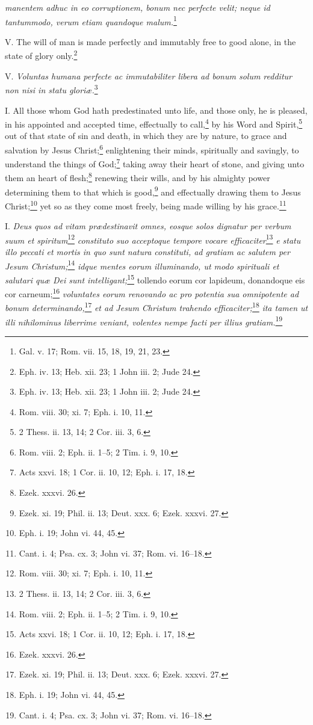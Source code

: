 \emph{manentem adhuc in eo corruptionem, bonum nec perfecte velit; neque id tantummodo, verum etiam quandoque malum.}\footnote{Gal. v. 17; Rom. vii. 15, 18, 19, 21, 23.}

V. The will of man is made perfectly and immutably free to good alone, in the state of glory only.\footnote{Eph. iv. 13; Heb. xii. 23; 1 John iii. 2; Jude 24.}

V. \emph{Voluntas humana perfecte ac immutabiliter libera ad bonum solum redditur non nisi in statu gloriæ.}\footnote{Eph. iv. 13; Heb. xii. 23; 1 John iii. 2; Jude 24.}


I. All those whom God hath predestinated unto life, and those only, he is pleased, in his appointed and accepted time, effectually to call,\footnote{Rom. viii. 30; xi. 7; Eph. i. 10, 11.} by his Word and Spirit,\footnote{2 Thess. ii. 13, 14; 2 Cor. iii. 3, 6.} out of that state of sin and death, in which they are by nature, to grace and salvation by Jesus Christ;\footnote{Rom. viii. 2; Eph. ii. 1–5; 2 Tim. i. 9, 10.} enlightening their minds, spiritually and savingly, to understand the things of God;\footnote{Acts xxvi. 18; 1 Cor. ii. 10, 12; Eph. i. 17, 18.} taking away their heart of stone, and giving unto them an heart of flesh;\footnote{Ezek. xxxvi. 26.} renewing their wills, and by his almighty power determining them to that which is good,\footnote{Ezek. xi. 19; Phil. ii. 13; Deut. xxx. 6; Ezek. xxxvi. 27.} and effectually drawing them to Jesus Christ;\footnote{Eph. i. 19; John vi. 44, 45.} yet so as they come most freely, being made willing by his grace.\footnote{Cant. i. 4; Psa. cx. 3; John vi. 37; Rom. vi. 16–18.}

I. \emph{Deus quos ad vitam prædestinavit omnes, eosque solos dignatur per verbum suum et spiritum}\footnote{Rom. viii. 30; xi. 7; Eph. i. 10, 11.}\emph{ constituto suo acceptoque tempore vocare efficaciter}\footnote{2 Thess. ii. 13, 14; 2 Cor. iii. 3, 6.}\emph{ e statu illo peccati et mortis in quo sunt natura constituti, ad gratiam ac salutem per Jesum Christum;}\footnote{Rom. viii. 2; Eph. ii. 1–5; 2 Tim. i. 9, 10.}\emph{ idque mentes eorum illuminando, ut modo spirituali et salutari quæ Dei sunt intelligant;}\footnote{Acts xxvi. 18; 1 Cor. ii. 10, 12; Eph. i. 17, 18.} tollendo eorum cor lapideum, donandoque eis cor carneum;\footnote{Ezek. xxxvi. 26.}\emph{ voluntates eorum renovando ac pro potentia sua omnipotente ad bonum determinando,}\footnote{Ezek. xi. 19; Phil. ii. 13; Deut. xxx. 6; Ezek. xxxvi. 27.}\emph{ et ad Jesum Christum trahendo efficaciter;}\footnote{Eph. i. 19; John vi. 44, 45.}\emph{ ita tamen ut illi nihilominus liberrime veniant, volentes nempe facti per illius gratiam.}\footnote{Cant. i. 4; Psa. cx. 3; John vi. 37; Rom. vi. 16–18.}

